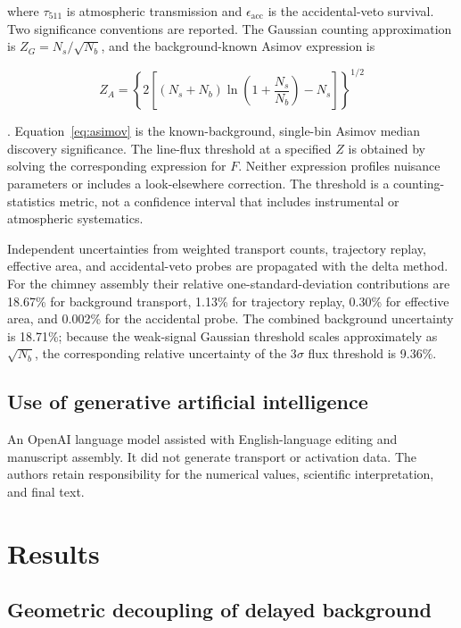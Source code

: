 \documentclass[11pt]{article}
\begin{document}
where $\tau_{511}$ is atmospheric transmission and
$\epsilon_{\mathrm{acc}}$ is the accidental-veto survival. Two significance
conventions are reported. The Gaussian counting approximation is
$Z_G=N_s/\sqrt{N_b}$, and the background-known Asimov expression is

\begin{equation}
  Z_A=\left\{2\left[(N_s+N_b)\ln\left(1+\frac{N_s}{N_b}\right)-N_s\right]
       \right\}^{1/2}
  \label{eq:asimov}
\end{equation}

\citep{Cowan2011}. Equation~\eqref{eq:asimov} is the known-background,
single-bin Asimov median discovery significance. The line-flux threshold at a
specified $Z$ is obtained by solving the corresponding expression for $F$.
Neither expression profiles nuisance parameters or includes a
look-elsewhere correction. The threshold is a counting-statistics metric, not
a confidence interval that includes instrumental or atmospheric systematics.

Independent uncertainties from weighted transport counts, trajectory replay,
effective area, and accidental-veto probes are propagated with the delta
method. For the chimney assembly their relative one-standard-deviation
contributions are 18.67\% for background transport, 1.13\% for trajectory
replay, 0.30\% for effective area, and 0.002\% for the accidental probe. The
combined background uncertainty is 18.71\%; because the weak-signal Gaussian
threshold scales approximately as $\sqrt{N_b}$, the corresponding relative
uncertainty of the 3$\sigma$ flux threshold is 9.36\%.

\subsection{Use of generative artificial intelligence}

An OpenAI language model assisted with English-language editing and manuscript
assembly. It did not generate transport or activation data. The authors retain
responsibility for the numerical values, scientific interpretation, and final
text.

\section{Results}
\label{sec:results}

\subsection{Geometric decoupling of delayed background}
\label{sec:coupling}
\end{document}
